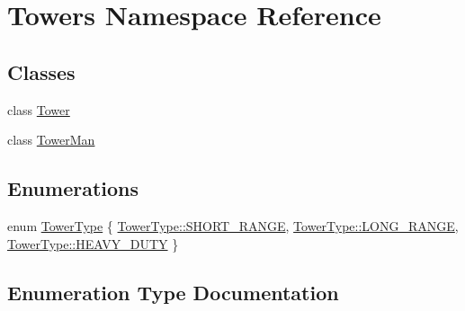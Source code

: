 \hypertarget{namespaceTowers}{}\section{Towers Namespace Reference}
\label{namespaceTowers}
\subsection*{Classes}
\begin{DoxyCompactItemize}
\item 
class \hyperlink{classTowers_1_1Tower}{Tower}
\item 
class \hyperlink{classTowers_1_1TowerMan}{Tower\+Man}
\end{DoxyCompactItemize}
\subsection*{Enumerations}
\begin{DoxyCompactItemize}
\item 
enum \hyperlink{namespaceTowers_a6f61f1aa71f1052d02a163c184fc35b0}{Tower\+Type} \{ \hyperlink{namespaceTowers_a6f61f1aa71f1052d02a163c184fc35b0a6ff4f6dd5ff3308845c1a7bbd08b176b}{Tower\+Type\+::\+S\+H\+O\+R\+T\+\_\+\+R\+A\+N\+GE}, 
\hyperlink{namespaceTowers_a6f61f1aa71f1052d02a163c184fc35b0ac7b52abd380be6c4757c5ef43562a60c}{Tower\+Type\+::\+L\+O\+N\+G\+\_\+\+R\+A\+N\+GE}, 
\hyperlink{namespaceTowers_a6f61f1aa71f1052d02a163c184fc35b0aef2c9b57184f481b9f27cb74c3bc6372}{Tower\+Type\+::\+H\+E\+A\+V\+Y\+\_\+\+D\+U\+TY}
 \}
\end{DoxyCompactItemize}


\subsection{Enumeration Type Documentation}
